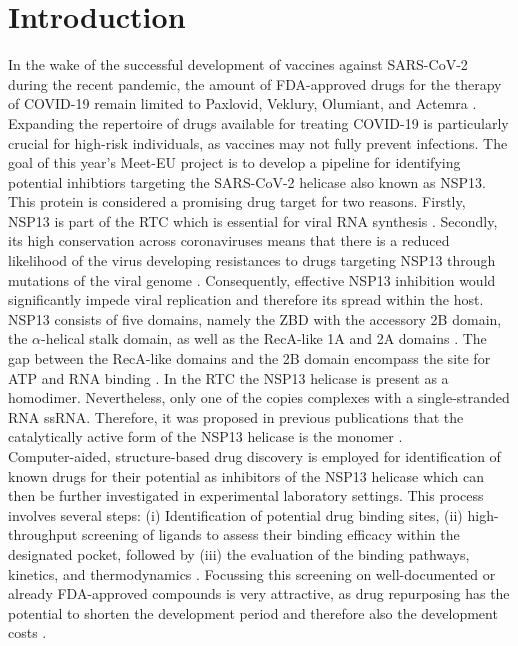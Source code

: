 \documentclass[11pt, letterpaper, titlepage]{article}
\renewcommand{\cite}{\parencite}
\begin{document}
\section{Introduction}
In the wake of the successful development of vaccines against \ac{SARS-CoV-2} during the recent pandemic, the amount of FDA-approved drugs for the therapy of \ac{COVID-19} remain limited to Paxlovid, Veklury, Olumiant, and Actemra \cite{FDACOVID}. Expanding the repertoire of drugs available for treating \ac{COVID-19} is particularly crucial for high-risk individuals, as vaccines may not fully prevent infections. The goal of this year's Meet-EU project is to develop a pipeline for identifying potential inhibtiors targeting the SARS-CoV-2 helicase also known as \ac{NSP13}. 
This protein is considered a promising drug target for two reasons. Firstly, \ac{NSP13} is part of the \ac{RTC} which is essential for viral RNA synthesis \cite{Malone_2022}. Secondly, its high conservation across coronaviruses means that there is a reduced likelihood of the virus developing resistances to drugs targeting \ac{NSP13} through mutations of the viral genome \cite{Spratt_2021}. Consequently, effective \ac{NSP13} inhibition would significantly impede viral replication and therefore its spread within the host. 
\ac{NSP13} consists of five domains, namely the \ac{ZBD} with the accessory 2B domain, the $\alpha$-helical stalk domain, as well as the RecA-like 1A and 2A domains \cite{Marecki}. The gap between the RecA-like domains and the 2B domain encompass the site for ATP and RNA binding \cite{NSP13_basics}. In the \ac{RTC} the NSP13 helicase is present as a homodimer. Nevertheless, only one of the copies complexes with a single-stranded RNA \ac{ssRNA}. Therefore, it was proposed in previous publications that the catalytically active form of the \ac{NSP13} helicase is the monomer \cite{Berta_2021}. \\

\noindent Computer-aided, structure-based drug discovery is employed for identification of known drugs for their potential as inhibitors of the \ac{NSP13} helicase which can then be further investigated in experimental laboratory settings. This process involves several steps: (i) Identification of potential drug binding sites, (ii) high-throughput screening of ligands to assess their binding efficacy within the  designated pocket, followed by (iii) the evaluation of the binding pathways, kinetics, and thermodynamics \cite{Sledz_2018}. Focussing this screening on well-documented or already FDA-approved compounds is very attractive, as drug repurposing has the potential to shorten the development period and therefore also the development costs \cite{Pushpakom_2019}.
\end{document}
